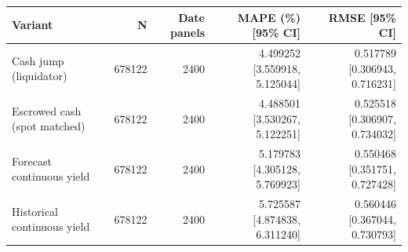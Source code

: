 \begin{tabular}{lrrrr}
\toprule
Variant & N & Date panels & MAPE (\%) [95\% CI] & RMSE [95\% CI] \\
\midrule
Cash jump (liquidator) & 678122 & 2400 & 4.499252 [3.559918, 5.125044] & 0.517789 [0.306943, 0.716231] \\
Escrowed cash (spot matched) & 678122 & 2400 & 4.488501 [3.530267, 5.122251] & 0.525518 [0.306907, 0.734032] \\
Forecast continuous yield & 678122 & 2400 & 5.179783 [4.305128, 5.769923] & 0.550468 [0.351751, 0.727428] \\
Historical continuous yield & 678122 & 2400 & 5.725587 [4.874838, 6.311240] & 0.560446 [0.367044, 0.730793] \\
\bottomrule
\end{tabular}
